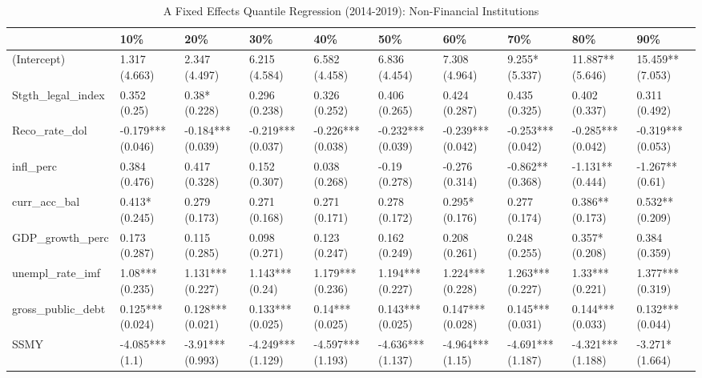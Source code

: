 \begin{table}[ht]
\centering
\caption{A Fixed Effects Quantile Regression (2014-2019): Non-Financial Institutions} 
\begingroup\small
\begin{tabular}{llllllllll}
  \toprule
 & 10\% & 20\% & 30\% & 40\% & 50\% & 60\% & 70\% & 80\% & 90\% \\ 
  \midrule
(Intercept) & 1.317 (4.663) & 2.347 (4.497) & 6.215 (4.584) & 6.582 (4.458) & 6.836 (4.454) & 7.308 (4.964) & 9.255* (5.337) & 11.887** (5.646) & 15.459** (7.053) \\ 
  Stgth\_legal\_index & 0.352 (0.25) & 0.38* (0.228) & 0.296 (0.238) & 0.326 (0.252) & 0.406 (0.265) & 0.424 (0.287) & 0.435 (0.325) & 0.402 (0.337) & 0.311 (0.492) \\ 
  Reco\_rate\_dol & -0.179*** (0.046) & -0.184*** (0.039) & -0.219*** (0.037) & -0.226*** (0.038) & -0.232*** (0.039) & -0.239*** (0.042) & -0.253*** (0.042) & -0.285*** (0.042) & -0.319*** (0.053) \\ 
  infl\_perc & 0.384 (0.476) & 0.417 (0.328) & 0.152 (0.307) & 0.038 (0.268) & -0.19 (0.278) & -0.276 (0.314) & -0.862** (0.368) & -1.131** (0.444) & -1.267** (0.61) \\ 
  curr\_acc\_bal & 0.413* (0.245) & 0.279 (0.173) & 0.271 (0.168) & 0.271 (0.171) & 0.278 (0.172) & 0.295* (0.176) & 0.277 (0.174) & 0.386** (0.173) & 0.532** (0.209) \\ 
  GDP\_growth\_perc & 0.173 (0.287) & 0.115 (0.285) & 0.098 (0.271) & 0.123 (0.247) & 0.162 (0.249) & 0.208 (0.261) & 0.248 (0.255) & 0.357* (0.208) & 0.384 (0.359) \\ 
  unempl\_rate\_imf & 1.08*** (0.235) & 1.131*** (0.227) & 1.143*** (0.24) & 1.179*** (0.236) & 1.194*** (0.227) & 1.224*** (0.228) & 1.263*** (0.227) & 1.33*** (0.221) & 1.377*** (0.319) \\ 
  gross\_public\_debt & 0.125*** (0.024) & 0.128*** (0.021) & 0.133*** (0.025) & 0.14*** (0.025) & 0.143*** (0.025) & 0.147*** (0.028) & 0.145*** (0.031) & 0.144*** (0.033) & 0.132*** (0.044) \\ 
  SSMY & -4.085*** (1.1) & -3.91*** (0.993) & -4.249*** (1.129) & -4.597*** (1.193) & -4.636*** (1.137) & -4.964*** (1.15) & -4.691*** (1.187) & -4.321*** (1.188) & -3.271* (1.664) \\ 
   \bottomrule
\end{tabular}
\endgroup
\end{table}
